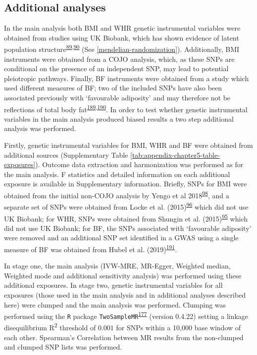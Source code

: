 \documentclass[11pt,twoside]{bristolthesis}
\begin{document}
\hypertarget{additional-analyses}{%
\subsection{Additional analyses}\label{additional-analyses}}

In the main analysis both BMI and WHR genetic instrumental variables were obtained from studies using UK Biobank, which has shown evidence of latent population structure\textsuperscript{\protect\hyperlink{ref-Haworth2019}{89},\protect\hyperlink{ref-Berg2019}{90}} (See \ref{mendelian-randomization}). Additionally, BMI instruments were obtained from a COJO analysis, which, as these SNPs are conditional on the presence of an independent SNP, may lead to potential pleiotropic pathways. Finally, BF instruments were obtained from a study which used different measures of BF; two of the included SNPs have also been associated previously with `favourable adiposity' and may therefore not be reflections of total body fat\textsuperscript{\protect\hyperlink{ref-Yaghootkar2014}{189},\protect\hyperlink{ref-Yaghootkar2016}{190}}. In order to test whether genetic instrumental variables in the main analysis produced biased results a two step additional analysis was performed.

Firstly, genetic instrumental variables for BMI, WHR and BF were obtained from additional sources (Supplementary Table \ref{tab:appendix-chapter5-table-exposures}). Outcome data extraction and harmonization was performed as for the main analysis. F statistics and detailed information on each additional exposure is available in Supplementary information. Briefly, SNPs for BMI were obtained from the initial non-COJO analysis by Yengo et al 2018\textsuperscript{\protect\hyperlink{ref-Yengo2018}{98}}, and a separate set of SNPs were obtained from Locke et al. (2015)\textsuperscript{\protect\hyperlink{ref-Locke2015}{96}} which did not use UK Biobank; for WHR, SNPs were obtained from Shungin et al. (2015)\textsuperscript{\protect\hyperlink{ref-Shungin2015}{95}} which did not use UK Biobank; for BF, the SNPs associated with `favourable adiposity' were removed and an additional SNP set identified in a GWAS using a single measure of BF was obtained from Hubel et al. (2019)\textsuperscript{\protect\hyperlink{ref-Hubel2019}{191}}.

In stage one, the main analysis (IVW-MRE, MR-Egger, Weighted median, Weighted mode and additional sensitivity analysis) was performed using these additional exposures. In stage two, genetic instrumental variables for all exposures (those used in the main analysis and in additional analyses described here) were clumped and the main analysis was performed. Clumping was performed using the \texttt{R} package \texttt{TwoSampleMR}\textsuperscript{\protect\hyperlink{ref-Hemani2018}{177}} (version 0.4.22) setting a linkage disequilibrium R\textsuperscript{2} threshold of \(0.001\) for SNPs within a 10,000 base window of each other. Spearman's Correlation between MR results from the non-clumped and clumped SNP lists was performed.
\end{document}
